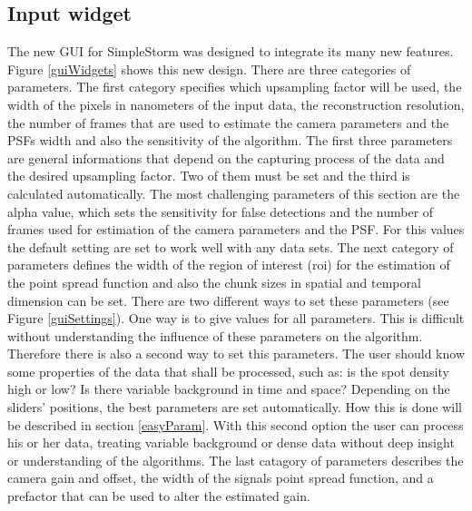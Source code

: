\subsection{Input widget}
The new GUI for SimpleStorm was designed to integrate its many new features. Figure \ref{guiWidgets} shows this new design. \newline
There are three categories of parameters. The first category specifies which upsampling factor will be used, the width of the pixels in nanometers of the input data, the reconstruction resolution, the number of frames that are used to estimate the camera parameters and the PSFs width and also the sensitivity of the algorithm. The first three parameters are general informations that depend on the capturing process of the data and the desired upsampling factor. Two of them must be set and the third is calculated automatically.\newline
The most challenging parameters of this section are the alpha value, which sets the sensitivity for false detections and the number of frames used for estimation of the camera parameters and the PSF. For this values the default setting are set to work well with any data sets. \newline
The next category of parameters defines the width of the region of interest (roi) for the estimation of the point spread function and also the chunk sizes in spatial and temporal dimension can be set. There are two different ways to set these parameters (see Figure \ref{guiSettings}). One way is to give values for all parameters. This is difficult without understanding the influence of these parameters on the algorithm. Therefore there is also a second way to set this parameters. The user should know some properties of the data that shall be processed, such as: is the spot density high or low? Is there variable background in time and space? Depending on the sliders' positions, the best parameters are set automatically. How this is done will be described in section \ref{easyParam}. With this second option the user can process his or her data, treating variable background or dense data without deep insight or understanding of the algorithms.\newline
The last catagory of parameters describes the camera gain and offset, the width of the signals point spread function, and a prefactor that can be used to alter the estimated gain. 
